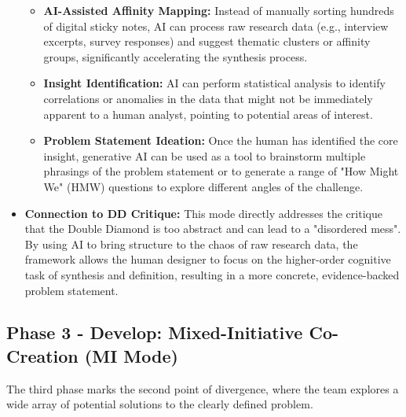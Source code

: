\documentclass[
  12pt,
  a4paper,
  bibliography=totoc,
  numbers=noenddot
]{scrartcl}
\begin{document}
\begin{itemize}
  \begin{itemize}
  \item
    \textbf{AI-Assisted Affinity Mapping:} Instead of manually sorting
    hundreds of digital sticky notes, AI can process raw research data
    (e.g., interview excerpts, survey responses) and suggest thematic
    clusters or affinity groups, significantly accelerating the
    synthesis process.\cite{maze2025double}
  \item
    \textbf{Insight Identification:} AI can perform statistical analysis
    to identify correlations or anomalies in the data that might not be
    immediately apparent to a human analyst, pointing to potential areas
    of interest.\cite{cogleus2025rise}
  \item
    \textbf{Problem Statement Ideation:} Once the human has identified
    the core insight, generative AI can be used as a tool to brainstorm
    multiple phrasings of the problem statement or to generate a range
    of "How Might We" (HMW) questions to explore different angles of the
    challenge.\cite{cuny2025combining}
  \end{itemize}
\item
  \textbf{Connection to DD Critique:} This mode directly addresses the
  critique that the Double Diamond is too abstract and can lead to a
  "disordered mess".\cite{danramsden2025limitations} By using AI to bring structure
  to the chaos of raw research data, the framework allows the human
  designer to focus on the higher-order cognitive task of synthesis and
  definition, resulting in a more concrete, evidence-backed problem
  statement.
\end{itemize}

\subsection{Phase 3 - Develop:
Mixed-Initiative Co-Creation (MI
Mode)}\label{phase-3---develop-mixed-initiative-co-creation-mi-mode}

The third phase marks the second point of divergence, where the team
explores a wide array of potential solutions to the clearly defined
problem.
\end{document}
